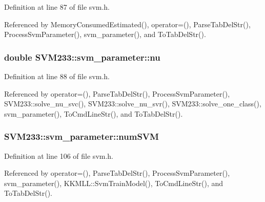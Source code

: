 Definition at line 87 of file svm.\+h.



Referenced by Memory\+Consumed\+Estimated(), operator=(), Parse\+Tab\+Del\+Str(), Process\+Svm\+Parameter(), svm\+\_\+parameter(), and To\+Tab\+Del\+Str().

\subsubsection[{\texorpdfstring{nu}{nu}}]{\setlength{\rightskip}{0pt plus 5cm}double S\+V\+M233\+::svm\+\_\+parameter\+::nu}\hypertarget{struct_s_v_m233_1_1svm__parameter_af40906fef0d3c731d1eb69b80d568f30}{}\label{struct_s_v_m233_1_1svm__parameter_af40906fef0d3c731d1eb69b80d568f30}


Definition at line 88 of file svm.\+h.



Referenced by operator=(), Parse\+Tab\+Del\+Str(), Process\+Svm\+Parameter(), S\+V\+M233\+::solve\+\_\+nu\+\_\+svc(), S\+V\+M233\+::solve\+\_\+nu\+\_\+svr(), S\+V\+M233\+::solve\+\_\+one\+\_\+class(), svm\+\_\+parameter(), To\+Cmd\+Line\+Str(), and To\+Tab\+Del\+Str().

\subsubsection[{\texorpdfstring{num\+S\+VM}{numSVM}}]{ S\+V\+M233\+::svm\+\_\+parameter\+::num\+S\+VM}\hypertarget{struct_s_v_m233_1_1svm__parameter_aac6ce26b15ecd7ce74d86a06982fae07}{}\label{struct_s_v_m233_1_1svm__parameter_aac6ce26b15ecd7ce74d86a06982fae07}


Definition at line 106 of file svm.\+h.



Referenced by operator=(), Parse\+Tab\+Del\+Str(), Process\+Svm\+Parameter(), svm\+\_\+parameter(), K\+K\+M\+L\+L\+::\+Svm\+Train\+Model(), To\+Cmd\+Line\+Str(), and To\+Tab\+Del\+Str().

